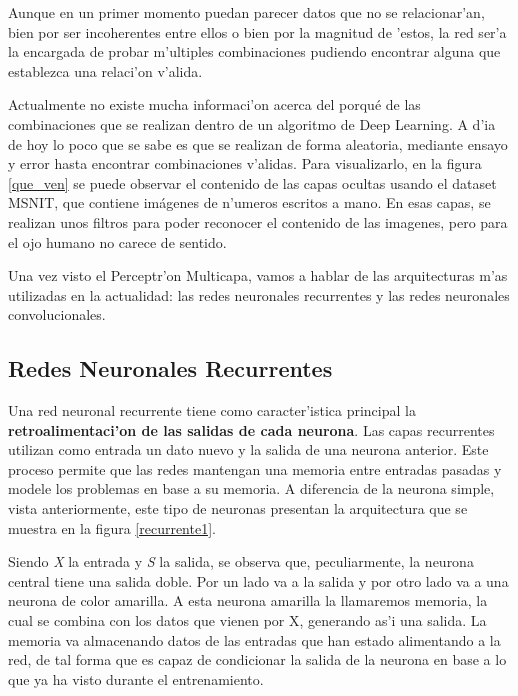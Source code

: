 Aunque en un primer momento puedan parecer datos que no se relacionar'an, bien por ser incoherentes entre ellos o bien por la magnitud de 'estos, la red ser'a la encargada de probar m'ultiples combinaciones pudiendo encontrar alguna que establezca una relaci'on v'alida. 

\clearpage

Actualmente no existe mucha informaci'on acerca del porqué de las combinaciones que se realizan dentro de un algoritmo de Deep Learning. A d'ia de hoy lo poco que se sabe es que se realizan de forma aleatoria, mediante ensayo y error hasta encontrar combinaciones v'alidas. Para visualizarlo, en la figura \ref{que_ven} se puede observar el contenido de las capas ocultas usando el dataset MSNIT, que contiene imágenes de n'umeros escritos a mano. En esas capas, se realizan unos filtros para poder reconocer el contenido de las imagenes, pero para el ojo humano no carece de sentido.


Una vez visto el Perceptr'on Multicapa, vamos a hablar de las arquitecturas m'as utilizadas en la actualidad: las redes neuronales recurrentes y las redes neuronales convolucionales. 

\clearpage

\subsection{Redes Neuronales Recurrentes}

Una red neuronal recurrente tiene como caracter'istica principal la \textbf{retroalimentaci'on de las salidas de cada neurona}. Las capas recurrentes utilizan como entrada un dato nuevo y la salida de una neurona anterior. Este proceso permite que las redes mantengan una memoria entre entradas pasadas y modele los problemas en base a su memoria. A diferencia de la neurona simple, vista anteriormente, este tipo de neuronas presentan la arquitectura que se muestra en la figura \ref{recurrente1}.
  

Siendo \textit{X} la entrada y \textit{S} la salida, se observa que, peculiarmente, la neurona central tiene una salida doble. Por un lado va a la salida y por otro lado va a una neurona de color amarilla. A esta neurona amarilla la llamaremos memoria, la cual se combina con los datos que vienen por X, generando as'i una salida. La memoria va almacenando datos de las entradas que han estado alimentando a la red, de tal forma que es capaz de condicionar la salida de la neurona en base a lo que ya ha visto durante el entrenamiento.

